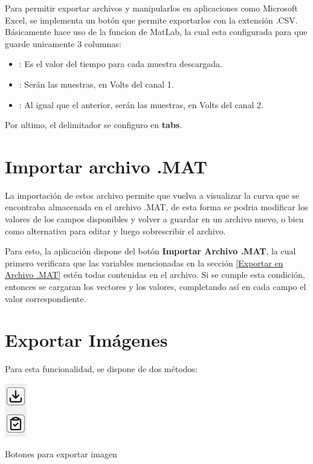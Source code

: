 Para permitir exportar archivos y manipularlos en aplicaciones como Microsoft Excel, se implementa un botón que permite exportarlos con la extensión .CSV. Básicamente hace uso de la funcion  de MatLab, la cual esta configurada para que guarde unicamente 3 columnas:

\begin{itemize}
	\item {}: Es el valor del tiempo para cada muestra descargada.
	\item {}: Serán las muestras, en Volts del canal 1.
	\item {}: Al igual que el anterior, serán las muestras, en Volts del canal 2.
\end{itemize}

Por ultimo, el delimitador se configuro en \textbf{tabs}.


\section{Importar archivo .MAT}
La importación de estos archivo permite que vuelva a visualizar la curva que se encontraba almacenada en el archivo .MAT, de esta forma se podria modificar los valores de los campos disponibles y volver a guardar en un archivo nuevo, o bien como alternativa para editar y luego sobrescribir el archivo.

Para esto, la aplicación dispone del botón \textbf{Importar Archivo .MAT}, la cual primero verificara que las variables mencionadas en la sección \ref{Exportar en Archivo .MAT} estén todas contenidas en el archivo. Si se cumple esta condición, entonces se cargaran los vectores y los valores, completando así en cada campo el valor correspondiente.






\section{Exportar Imágenes}
Para esta funcionalidad, se dispone de dos métodos:

\begin{center}
	\includegraphics[width=0.06\columnwidth]{images/Boton_ExportImage}
	\captionsetup{type=figure}
	\caption{Botones para exportar imagen}
	\label{fig:006}
\end{center}

